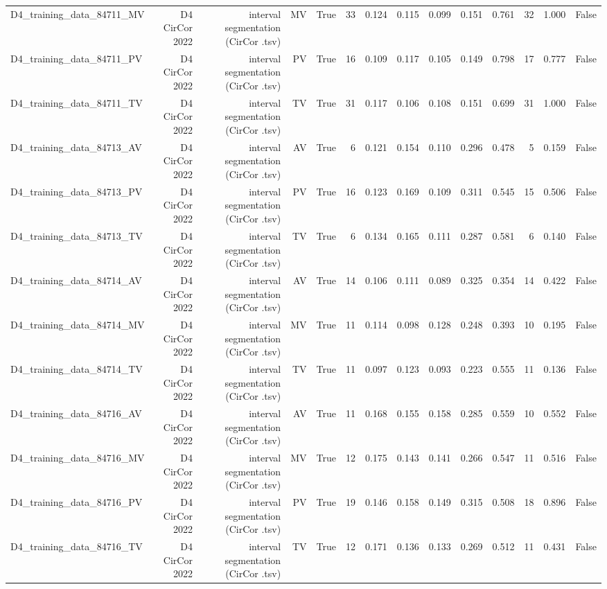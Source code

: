 \begin{table}[htbp]
\begin{tabular}{lrrrrrrrrrrrrr}
    D4\_training\_data\_84711\_MV & D4 CirCor 2022 & interval segmentation (CirCor .tsv) & MV & True & 33 & 0.124 & 0.115 & 0.099 & 0.151 & 0.761 & 32 & 1.000 & False \\
    D4\_training\_data\_84711\_PV & D4 CirCor 2022 & interval segmentation (CirCor .tsv) & PV & True & 16 & 0.109 & 0.117 & 0.105 & 0.149 & 0.798 & 17 & 0.777 & False \\
    D4\_training\_data\_84711\_TV & D4 CirCor 2022 & interval segmentation (CirCor .tsv) & TV & True & 31 & 0.117 & 0.106 & 0.108 & 0.151 & 0.699 & 31 & 1.000 & False \\
    D4\_training\_data\_84713\_AV & D4 CirCor 2022 & interval segmentation (CirCor .tsv) & AV & True & 6 & 0.121 & 0.154 & 0.110 & 0.296 & 0.478 & 5 & 0.159 & False \\
    D4\_training\_data\_84713\_PV & D4 CirCor 2022 & interval segmentation (CirCor .tsv) & PV & True & 16 & 0.123 & 0.169 & 0.109 & 0.311 & 0.545 & 15 & 0.506 & False \\
    D4\_training\_data\_84713\_TV & D4 CirCor 2022 & interval segmentation (CirCor .tsv) & TV & True & 6 & 0.134 & 0.165 & 0.111 & 0.287 & 0.581 & 6 & 0.140 & False \\
    D4\_training\_data\_84714\_AV & D4 CirCor 2022 & interval segmentation (CirCor .tsv) & AV & True & 14 & 0.106 & 0.111 & 0.089 & 0.325 & 0.354 & 14 & 0.422 & False \\
    D4\_training\_data\_84714\_MV & D4 CirCor 2022 & interval segmentation (CirCor .tsv) & MV & True & 11 & 0.114 & 0.098 & 0.128 & 0.248 & 0.393 & 10 & 0.195 & False \\
    D4\_training\_data\_84714\_TV & D4 CirCor 2022 & interval segmentation (CirCor .tsv) & TV & True & 11 & 0.097 & 0.123 & 0.093 & 0.223 & 0.555 & 11 & 0.136 & False \\
    D4\_training\_data\_84716\_AV & D4 CirCor 2022 & interval segmentation (CirCor .tsv) & AV & True & 11 & 0.168 & 0.155 & 0.158 & 0.285 & 0.559 & 10 & 0.552 & False \\
    D4\_training\_data\_84716\_MV & D4 CirCor 2022 & interval segmentation (CirCor .tsv) & MV & True & 12 & 0.175 & 0.143 & 0.141 & 0.266 & 0.547 & 11 & 0.516 & False \\
    D4\_training\_data\_84716\_PV & D4 CirCor 2022 & interval segmentation (CirCor .tsv) & PV & True & 19 & 0.146 & 0.158 & 0.149 & 0.315 & 0.508 & 18 & 0.896 & False \\
    D4\_training\_data\_84716\_TV & D4 CirCor 2022 & interval segmentation (CirCor .tsv) & TV & True & 12 & 0.171 & 0.136 & 0.133 & 0.269 & 0.512 & 11 & 0.431 & False \\

\end{tabular}
\end{table}
